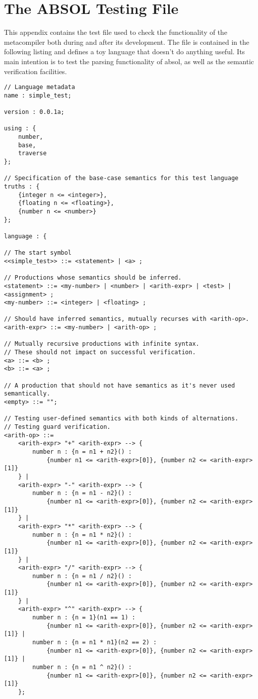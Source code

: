 \chapter{The ABSOL Testing File} %
\label{cha:the_absol_testing_file}
This appendix contains the test file used to check the functionality of the metacompiler both during and after its development. 
The file is contained in the following listing and defines a toy language that doesn't do anything useful.
Its main intention is to test the parsing functionality of \gls{absol}, as well as the semantic verification facilities. 

\begin{verbatim}
// Language metadata
name : simple_test;

version : 0.0.1a;

using : {
    number,
    base,
    traverse
};

// Specification of the base-case semantics for this test language
truths : {
    {integer n <= <integer>},
    {floating n <= <floating>},
    {number n <= <number>}
};

language : {

// The start symbol
<<simple_test>> ::= <statement> | <a> ;

// Productions whose semantics should be inferred.
<statement> ::= <my-number> | <number> | <arith-expr> | <test> | <assignment> ;
<my-number> ::= <integer> | <floating> ;

// Should have inferred semantics, mutually recurses with <arith-op>.
<arith-expr> ::= <my-number> | <arith-op> ;

// Mutually recursive productions with infinite syntax.
// These should not impact on successful verification.
<a> ::= <b> ;
<b> ::= <a> ;

// A production that should not have semantics as it's never used semantically.
<empty> ::= ""; 

// Testing user-defined semantics with both kinds of alternations. 
// Testing guard verification.
<arith-op> ::= 
    <arith-expr> "+" <arith-expr> --> {
        number n : {n = n1 + n2}() :
            {number n1 <= <arith-expr>[0]}, {number n2 <= <arith-expr>[1]}
    } |
    <arith-expr> "-" <arith-expr> --> {
        number n : {n = n1 - n2}() :
            {number n1 <= <arith-expr>[0]}, {number n2 <= <arith-expr>[1]}
    } |
    <arith-expr> "*" <arith-expr> --> {
        number n : {n = n1 * n2}() :
            {number n1 <= <arith-expr>[0]}, {number n2 <= <arith-expr>[1]}
    } |
    <arith-expr> "/" <arith-expr> --> {
        number n : {n = n1 / n2}() :
            {number n1 <= <arith-expr>[0]}, {number n2 <= <arith-expr>[1]}
    } |
    <arith-expr> "^" <arith-expr> --> {
        number n : {n = 1}(n1 == 1) :
            {number n1 <= <arith-expr>[0]}, {number n2 <= <arith-expr>[1]} |
        number n : {n = n1 * n1}(n2 == 2) :
            {number n1 <= <arith-expr>[0]}, {number n2 <= <arith-expr>[1]} |
        number n : {n = n1 ^ n2}() :
            {number n1 <= <arith-expr>[0]}, {number n2 <= <arith-expr>[1]}
    };


\end{verbatim}
